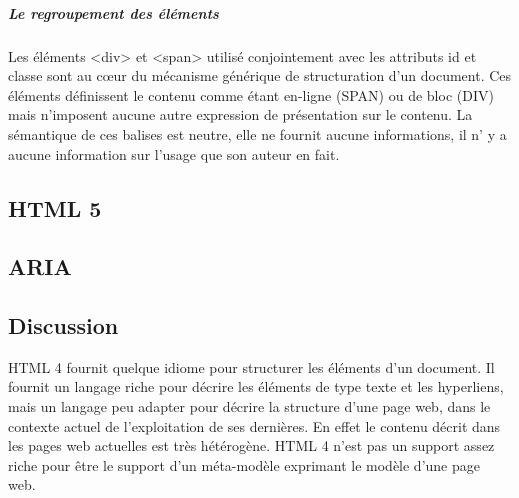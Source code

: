 \subparagraph{Le regroupement des éléments}
Les éléments <div> et <span> utilisé conjointement avec les attributs id et classe sont au cœur du mécanisme générique de structuration d'un document.
Ces éléments définissent le contenu comme étant en-ligne (SPAN) ou de bloc (DIV) mais n'imposent aucune autre expression de présentation sur le contenu. La sémantique de ces balises est neutre, elle ne fournit aucune informations, il n' y a aucune information sur l'usage que son auteur en fait.


\subsection{HTML 5}
\subsection{ARIA}
\subsection{Discussion}
HTML 4 fournit quelque idiome pour structurer les éléments d'un document. Il fournit un langage riche pour décrire les éléments de type texte et les hyperliens, mais un langage peu adapter pour décrire la structure d'une page web, dans le contexte actuel de l'exploitation de ses dernières. En effet le contenu décrit dans les pages web actuelles est très hétérogène.
HTML 4 n'est pas un support assez riche pour être le support d'un méta-modèle exprimant le modèle d'une page web.